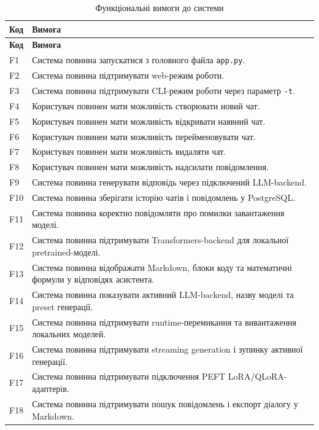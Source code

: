 \begin{longtable}{|p{1.5cm}|p{13.5cm}|}
\caption{Функціональні вимоги до системи}
\label{tab:functional-requirements}\\
\hline
\textbf{Код} & \textbf{Вимога} \\
\hline
\endfirsthead
\hline
\textbf{Код} & \textbf{Вимога} \\
\hline
\endhead
F1 & Система повинна запускатися з головного файла \texttt{app.py}. \\
\hline
F2 & Система повинна підтримувати web-режим роботи. \\
\hline
F3 & Система повинна підтримувати CLI-режим роботи через параметр \texttt{-t}. \\
\hline
F4 & Користувач повинен мати можливість створювати новий чат. \\
\hline
F5 & Користувач повинен мати можливість відкривати наявний чат. \\
\hline
F6 & Користувач повинен мати можливість перейменовувати чат. \\
\hline
F7 & Користувач повинен мати можливість видаляти чат. \\
\hline
F8 & Користувач повинен мати можливість надсилати повідомлення. \\
\hline
F9 & Система повинна генерувати відповідь через підключений LLM-backend. \\
\hline
F10 & Система повинна зберігати історію чатів і повідомлень у PostgreSQL. \\
\hline
F11 & Система повинна коректно повідомляти про помилки завантаження моделі. \\
\hline
F12 & Система повинна підтримувати Transformers-backend для локальної pretrained-моделі. \\
\hline
F13 & Система повинна відображати Markdown, блоки коду та математичні формули у відповідях асистента. \\
\hline
F14 & Система повинна показувати активний LLM-backend, назву моделі та preset генерації. \\
\hline
F15 & Система повинна підтримувати runtime-перемикання та вивантаження локальних моделей. \\
\hline
F16 & Система повинна підтримувати streaming generation і зупинку активної генерації. \\
\hline
F17 & Система повинна підтримувати підключення PEFT LoRA/QLoRA-адаптерів. \\
\hline
F18 & Система повинна підтримувати пошук повідомлень і експорт діалогу у Markdown. \\
\hline
\end{longtable}

